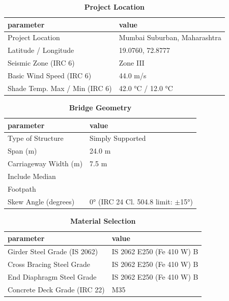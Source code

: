 \documentclass[12pt,a4paper]{report}
\numberwithin{table}{chapter}
\numberwithin{figure}{chapter}
\begin{document}
\begin{table}[H]
\caption{\textbf{Project Location}}
\label{subsec:project-location}
\begin{tabular}{|L{5.5cm}|L{8.5cm}|}
\hline
\textbf{parameter} & \textbf{value} \\
\hline
\textnormal{Project Location} & Mumbai Suburban, Maharashtra \\
\hline
\textnormal{Latitude / Longitude} & 19.0760, 72.8777 \\
\hline
\textnormal{Seismic Zone (IRC 6)} & Zone III \\
\hline
\textnormal{Basic Wind Speed (IRC 6)} & 44.0 m/s \\
\hline
\textnormal{Shade Temp. Max / Min (IRC 6)} & 42.0 °C / 12.0 °C \\
\hline
\end{tabular}
\vspace{0.4cm}
\end{table}

\begin{table}[H]
\caption{\textbf{Bridge Geometry}}
\label{subsec:bridge-geometry}
\begin{tabular}{|L{5.5cm}|L{8.5cm}|}
\hline
\textbf{parameter} & \textbf{value} \\
\hline
\textnormal{Type of Structure} & Simply Supported \\
\hline
\textnormal{Span (m)} & 24.0 m \\
\hline
\textnormal{Carriageway Width (m)} & 7.5 m \\
\hline
\textnormal{Include Median} &  \\
\hline
\textnormal{Footpath} &  \\
\hline
\textnormal{Skew Angle (degrees)} & 0° (IRC 24 Cl. 504.8 limit: $\pm$15°) \\
\hline
\end{tabular}
\end{table}
\vspace{0.4cm}

\begin{table}[H]
\caption{\textbf{Material Selection}}
\label{subsec:material}
\begin{tabular}{|L{5.5cm}|L{8.5cm}|}
\hline
\textbf{parameter} & \textbf{value} \\
\hline
\textnormal{Girder Steel Grade (IS 2062)} & IS 2062 E250 (Fe 410 W) B \\
\hline
\textnormal{Cross Bracing Steel Grade} & IS 2062 E250 (Fe 410 W) B \\
\hline
\textnormal{End Diaphragm Steel Grade} & IS 2062 E250 (Fe 410 W) B \\
\hline
\textnormal{Concrete Deck Grade (IRC 22)} & M35 \\
\hline
\end{tabular}
\end{table}
\vspace{0.4cm}
\end{document}
